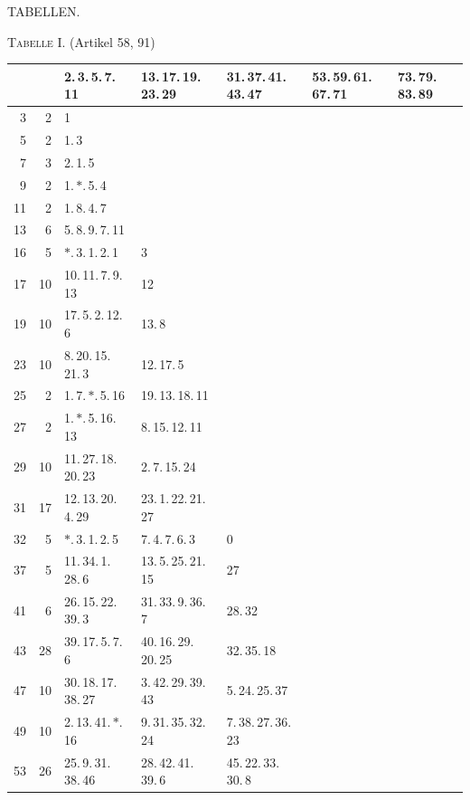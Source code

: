 \begin{landscape}\thispagestyle{empty}

\centerline{\large TABELLEN.}\smallskip

\centerline{\textsc{Tabelle I.} (Artikel 58, 91)}\smallskip
\begingroup\centering\fontsize{10}{11}\selectfont\renewcommand{\arraystretch}{0.87}\setlength{\tabcolsep}{4pt}
\begin{tabular}{r||r|lllll}\hline
 & & 2.\,3.\,5.\,7.\,11 & 13.\,17.\,19.\,23.\,29 & 31.\,37.\,41.\,43.\,47 & 53.\,59.\,61.\,67.\,71 & 73.\,79.\,83.\,89\\\hline
3 & 2 & 1 &  &  &  & \\
5 & 2 & 1.\,3 &  &  &  & \\
7 & 3 & 2.\,1.\,5 &  &  &  & \\
9 & 2 & 1.\,\(\ast\).\,5.\,4 &  &  &  & \\
11 & 2 & 1.\,8.\,4.\,7 &  &  &  & \\
13 & 6 & 5.\,8.\,9.\,7.\,11 &  &  &  & \\
16 & 5 & \(\ast\).\,3.\,1.\,2.\,1 & 3 &  &  & \\
17 & 10 & 10.\,11.\,7.\,9.\,13 & 12 &  &  & \\
19 & 10 & 17.\,5.\,2.\,12.\,6 & 13.\,8 &  &  & \\
23 & 10 & 8.\,20.\,15.\,21.\,3 & 12.\,17.\,5 &  &  & \\
25 & 2 & 1.\,7.\,\(\ast\).\,5.\,16 & 19.\,13.\,18.\,11 &  &  & \\
27 & 2 & 1.\,\(\ast\).\,5.\,16.\,13 & 8.\,15.\,12.\,11 &  &  & \\
29 & 10 & 11.\,27.\,18.\,20.\,23 & 2.\,7.\,15.\,24 &  &  & \\
31 & 17 & 12.\,13.\,20.\,4.\,29 & 23.\,1.\,22.\,21.\,27 &  &  & \\
32 & 5 & \(\ast\).\,3.\,1.\,2.\,5 & 7.\,4.\,7.\,6.\,3 & 0 &  & \\
37 & 5 & 11.\,34.\,1.\,28.\,6 & 13.\,5.\,25.\,21.\,15 & 27 &  & \\
41 & 6 & 26.\,15.\,22.\,39.\,3 & 31.\,33.\,9.\,36.\,7 & 28.\,32 &  & \\
43 & 28 & 39.\,17.\,5.\,7.\,6 & 40.\,16.\,29.\,20.\,25 & 32.\,35.\,18 &  & \\
47 & 10 & 30.\,18.\,17.\,38.\,27 & 3.\,42.\,29.\,39.\,43 & 5.\,24.\,25.\,37 &  & \\
49 & 10 & 2.\,13.\,41.\,\(\ast\).\,16 & 9.\,31.\,35.\,32.\,24 & 7.\,38.\,27.\,36.\,23 &  & \\
53 & 26 & 25.\,9.\,31.\,38.\,46 & 28.\,42.\,41.\,39.\,6 & 45.\,22.\,33.\,30.\,8 &  & \\

\end{tabular}
\end{landscape}
